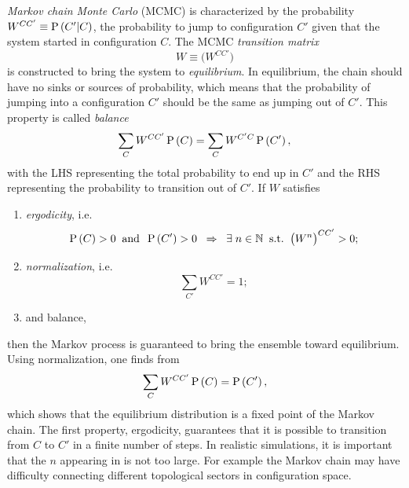 {\it Markov chain Monte Carlo} (MCMC) is characterized by the probability 
$W^{CC'}\equiv\operatorname{P}\left(C'|C\right)$, the probability to jump to configuration 
$C'$ given that the system started in configuration $C$.
The MCMC {\it transition matrix}
\begin{equation}
  W\equiv\Big(W^{CC'}\Big)
\end{equation}
is constructed to bring the system to {\it equilibrium}.
In equilibrium, the chain should have no sinks or sources of probability,
which means that the probability of jumping into a configuration $C'$
should be the same as jumping out of $C'$. This property
is called {\it balance}
\begin{equation}\label{eq:balance}
    \sum\limits_CW^{CC'}\operatorname{P}\left(C\right)=
    \sum\limits_CW^{C'C}\operatorname{P}\left(C'\right),
\end{equation}
with the LHS representing the total probability to end up in $C'$ and
the RHS representing the probability to transition out of $C'$.
If $W$ satisfies
\begin{enumerate}
  \item {\it ergodicity}, i.e.
        \begin{equation}\label{eq:ergodicity}
          \operatorname{P}\left(C\right)>0\;\;\text{and}\;\;\operatorname{P}\left(C'\right)>0\;\;\Rightarrow\;\;
          \exists\;n\in\mathbb{N}\;\;\text{s.t.}\;\;\big(W^n\big)^{CC'}>0;
        \end{equation}
  \item {\it normalization}, i.e.
        \begin{equation}
          \sum\limits_{C'}W^{CC'}=1;
        \end{equation}
  \item and balance, 
\end{enumerate}
then the Markov process is guaranteed to bring the ensemble toward 
equilibrium. Using normalization, one finds from 
\begin{equation}\index{balance}
    \sum\limits_CW^{CC'}\pr{C}=\pr{C'},
\end{equation}
which shows that the equilibrium distribution is a fixed point of
the Markov chain. The first property, ergodicity, guarantees that it
is possible to transition from $C$ to $C'$ in a finite number of steps.
In realistic simulations, it is important that the $n$ appearing in
 is not too large. For example 
the Markov chain may have difficulty connecting different topological sectors
in configuration space.

